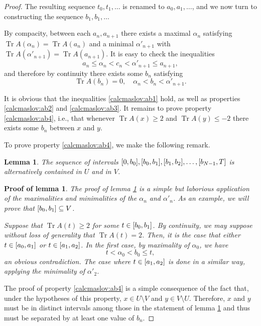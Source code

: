 \documentclass{article}
\newtheorem{lemma}{Lemma}
\theoremstyle{nonumberplain}
\newtheorem{proof}{Proof}
\newtheorem{lemmaproof}{Proof of lemma}
\DeclareMathOperator{\trace}{Tr}
\begin{document}
\begin{proof}
The resulting sequence $t_0, t_1, \dots$ is renamed to $a_0, a_1, \dots$, and we now turn to constructing the sequence $b_1, b_1, \dots$

By compacity, between each $a_n, a_{n+1}$ there exists a maximal $\alpha_n$ satisfying $\trace A(\alpha_n) = \trace A(a_n)$ and a minimal $\alpha'_{n+1}$ with $\trace A(\alpha'_{n+1}) = \trace A(a_{n+1})$. It is easy to check the inequalities
\begin{equation}
a_n \leq \alpha_n < c_n <\alpha'_{n+1} \leq a_{n+1},
\end{equation}
and therefore by continuity there exists some $b_n$ satisfying
\begin{equation}
\trace A(b_n) = 0, \quad \alpha_n < b_n < \alpha'_{n+1}.
\end{equation}

It is obvious that the inequalities \eqref{calcmaslov:ab1} hold, as well as properties \ref{calcmaslov:ab2} and \ref{calcmaslov:ab3}. It remains to prove property \ref{calcmaslov:ab4}, i.e., that whenever $\trace A(x) \geq 2$ and $\trace A(y) \leq -2$ there exists some $b_n$ between $x$ and $y$.

To prove property \ref{calcmaslov:ab4}, we make the following remark.
\begin{lemma}\label{calcmaslov:lemma1}
The sequence of intervals $\interval 0 {b_0}, \interval {b_0}{b_1}, \interval{b_1}{b_2}, \dots, \interval{b_{N-1}}T$ is alternatively contained in $U$ and in $V$.
\end{lemma}

\begin{lemmaproof}
The proof of lemma \ref{calcmaslov:lemma1} is a simple but laborious application of the maximalities and minimalities of the $\alpha_n$ and $\alpha'_n$. As an example, we will prove that $\interval{b_0}{b_1} \subseteq V$.

Suppose that $\trace A(t) \geq 2$ for some $t \in \interval{b_0}{b_1}$. By continuity, we may suppose without loss of generality that $\trace A(t) = 2$. Then, it is the case that either $t \in \interval{a_0}{a_1}$ or $t \in \interval{a_1}{a_2}$. In the first case, by maximality of $\alpha_0$, we have
\begin{equation}
t < \alpha_0 < b_0 \leq t,
\end{equation}
an obvious contradiction. The case where $t \in \interval{a_1}{a_2}$ is done in a similar way, applying the minimality of $\alpha'_2$.
\end{lemmaproof}

The proof of property \ref{calcmaslov:ab4} is a simple consequence of the fact that, under the hypotheses of this property, $x \in U \setminus V$ and $y \in V \setminus U$. Therefore, $x$ and $y$ must be in distinct intervals among those in the statement of lemma \ref{calcmaslov:lemma1} and thus must be separated by at least one value of $b_n$.


\end{proof}
\end{document}
